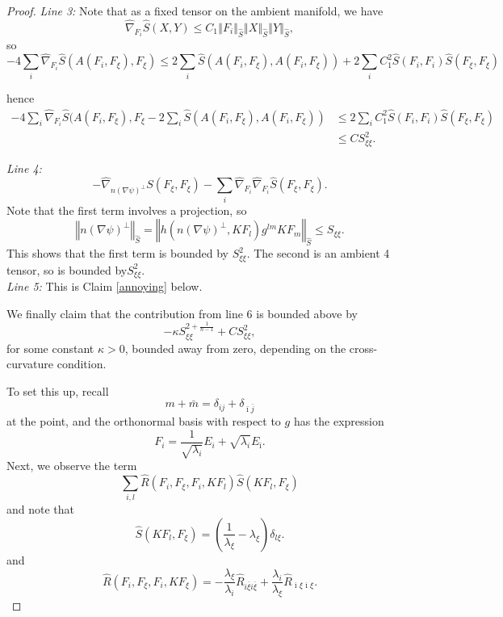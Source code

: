 \documentclass[12pt,letterpaper]{amsart}%
\numberwithin{mycounter}{section}
\theoremstyle{plain}
\numberwithin{equation}{section}
\theoremstyle{definition}
\newcommand{\maxidx}{\mathord{\xi}} %
\begin{document}
\begin{proof}
\textit{Line 3:} Note that as a fixed tensor on the ambient manifold, we have
\[
\hat{\nabla}_{F_{i}}\hat{S}(X,Y)
\leq C_{1}\left\Vert F_{i}\right\Vert
_{\hat{S}}\left\Vert X\right\Vert _{\hat{S}}\left\Vert Y\right\Vert _{\hat{S}},
\]
so
\[
-4\sum_{i}\hat{\nabla}_{F_{i}}\hat{S}(A(F_{i},F_{\maxidx}),F_{\maxidx})
\leq
2\sum_{i}\hat{S}(A(F_{i},F_{\maxidx}),A(F_{i},F_{\maxidx}))
+2\sum_{i}C_{1}^{2}\hat{S}(F_{i},F_{i})\hat{S}(F_{\maxidx},F_{\maxidx})
\]

hence
\begin{align*}
-4\sum_{i}\hat{\nabla}_{F_{i}}\hat{S}(A(F_{i},F_{\maxidx}),F_{\maxidx}
-2\sum_{i}\hat{S}(A(F_{i},F_{\maxidx}),A(F_{i},F_{\maxidx}))  
&\leq 2\sum_{i}C_{1}^{2}\hat{S}(F_{i},F_{i})\hat{S}(F_{\maxidx},F_{\maxidx})\\
&\leq C S_{\maxidx\maxidx}^{2}.
\end{align*}

\textit{Line 4:}
\[
-\hat{\nabla}_{n\left(  \nabla\psi\right)  ^{\perp}}
S(F_{\maxidx},F_{\maxidx})
-\sum_{i}\hat{\nabla}_{F_{i}}\hat{\nabla}_{F_{i}}\hat{S}(F_{\maxidx},F_{\maxidx}).
\]
Note that the first term involves a projection, so
\[
\left\Vert n\left(  \nabla\psi\right)  ^{\perp}\right\Vert _{\hat{S}}
=\left\Vert
h(n\left(  \nabla\psi\right)  ^{\perp},KF_{l})g^{lm}KF_{m}\right\Vert_{\hat{S}} 
\leq S_{\maxidx\maxidx}.
\]
This shows that the first term is bounded by $S_{\maxidx\maxidx}^{2}.$ 
The second is an ambient 4 tensor, so is bounded by$S_{\maxidx\maxidx}^{2}.$\\

\textit{Line 5:} This is Claim \ref{annoying} below.

We finally claim that the contribution from line 6 is bounded above by
\[
-\kappa S_{\maxidx\maxidx}^{2+\frac{1}{n-1}} + C S_{\maxidx\maxidx}^{2},
\]
for some constant $\kappa>0$, bounded away from zero, 
depending on the cross-curvature condition.

To set this up, recall
\[
m+\bar{m}=\delta_{ij}+\delta_{\bar{\imath}
\bar{j}}
\]
at the point, and the orthonormal basis with respect to $g$ has the
expression
\[
F_i=\frac{1}{\sqrt{\lambda_{i}}}E_{i}
  +\sqrt{\lambda_{i}}E_{\bar{\imath}}.
\]
Next, we observe the term
\[
\sum_{i,l}\hat{R}(F_{i},F_{\maxidx},F_{i},KF_{l})\hat{S}(KF_{l},F_{\maxidx})
\]
and note that
\[
\hat{S}(KF_{l},F_{\maxidx})
=\left(  \frac{1}{\lambda_{\maxidx}}-\lambda_{\maxidx}\right)\delta_{l\maxidx}.
\]
and 
\[
\hat{R}(F_{i},F_{\maxidx},F_{i},KF_{\maxidx})
=-\frac{\lambda_{\maxidx}}{\lambda_{i}}\hat{R}_{i\overline{\maxidx} i\overline{\maxidx}}
+\frac{\lambda_{i}}{\lambda_{\maxidx}}\hat{R}_{\overline{\imath}\maxidx\overline{\imath}\maxidx}.
\]


\end{proof}
\end{document}
